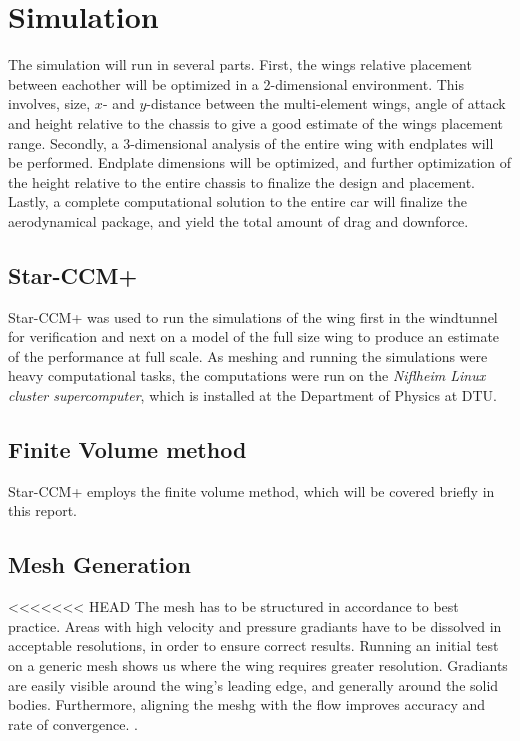 \chapter{Simulation}

  The simulation will run in several parts. First, the wings relative placement between eachother will be optimized in a 2-dimensional environment. This involves, size, $x$- and $y$-distance between the multi-element wings, angle of attack and height relative to the chassis to give a good estimate of the wings placement range. Secondly, a 3-dimensional analysis of the entire wing with endplates will be performed. Endplate dimensions will be optimized, and further optimization of the height relative to the entire chassis to finalize the design and placement. Lastly, a complete computational solution to the entire car will finalize the aerodynamical package, and yield the total amount of drag and downforce.

\section{Star-CCM+}

Star-CCM+ was used to run the simulations of the wing first in the windtunnel for verification and next on a model of the full size wing to produce an estimate of the performance at full scale. As meshing and running the simulations were heavy computational tasks, the computations were run on the \emph{Niflheim Linux cluster supercomputer}, which is installed at the Department of Physics at DTU.


\section{Finite Volume method}

  Star-CCM+ employs the finite volume method, which will be covered briefly in this report.

\section{Mesh Generation}

<<<<<<< HEAD
  The mesh has to be structured in accordance to best practice. Areas with high velocity and pressure gradiants have to be dissolved in acceptable resolutions, in order to ensure correct results. Running an initial test on a generic mesh shows us where the wing requires greater resolution. Gradiants are easily visible around the wing's leading edge, and generally around the solid bodies. Furthermore, aligning the meshg with the flow improves accuracy and rate of convergence.
  .

